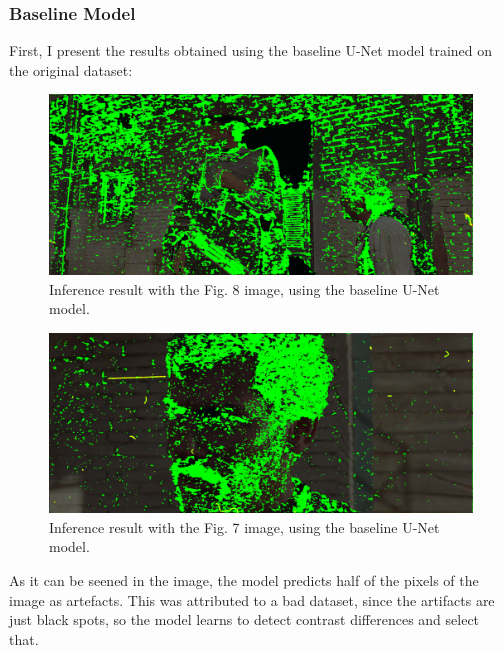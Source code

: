 \documentclass[openany, 12pt]{article}
\begin{document}
{\subsubsection*{Baseline Model}
First, I present the results obtained using the baseline U-Net model trained on the original dataset:
\begin{figure}[h!]
\centering
\includegraphics[width=0.7\linewidth]{images/punado_dollars_frame_0122.png_mask_30_epochs_unet_28.png_comparaison.png}
\caption{\smaller Inference result with the Fig. 8 image, using the baseline U-Net model.} 
\end{figure}
\begin{figure}[h!]
	\centering
	\includegraphics[width=0.7\linewidth]{images/punado_dollars_frame_0084.png_mask_30_epochs_unet_25.png_comparaison.png}
	\caption{\smaller Inference result with the Fig. 7 image, using the baseline U-Net model.} 
\end{figure}
As it can be seened in the image, the model predicts half of the pixels of the image as artefacts. This was attributed to a bad dataset, since the artifacts are just black spots, so the model learns to detect contrast differences and select that. 
\newpage
}
\end{document}
